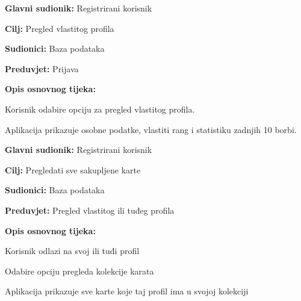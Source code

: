 	\noindent {}
	\begin{packed_item}
		
		\item \textbf{Glavni sudionik: }Registrirani korisnik
		\item  \textbf{Cilj:} Pregled vlastitog profila
		\item  \textbf{Sudionici:} Baza podataka
		\item  \textbf{Preduvjet:} Prijava
		\item  \textbf{Opis osnovnog tijeka:}
		
		\item[] \begin{packed_enum}
			
			\item Korisnik odabire opciju za pregled vlastitog profila.
			\item Aplikacija prikazuje osobne podatke, vlastiti rang i statistiku zadnjih 10 borbi.
		\end{packed_enum}
	\end{packed_item}

\noindent {}
\begin{packed_item}
	
	\item \textbf{Glavni sudionik: }Registrirani korisnik
	\item  \textbf{Cilj:} Pregledati sve sakupljene karte
	\item  \textbf{Sudionici:} Baza podataka
	\item  \textbf{Preduvjet:} Pregled vlastitog ili tuđeg profila
	\item  \textbf{Opis osnovnog tijeka:}
	
	\item[] \begin{packed_enum}
		
		\item Korisnik odlazi na svoj ili tuđi profil
		\item Odabire opciju pregleda kolekcije karata
		\item Aplikacija prikazuje sve karte koje taj profil ima u svojoj kolekciji
	\end{packed_enum}
\end{packed_item}

